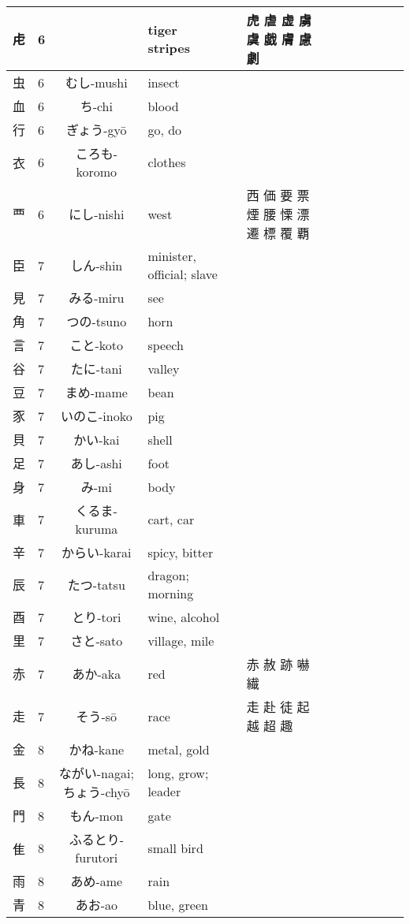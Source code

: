 \documentclass{article}
\begin{document}
{\begin{longtable}{|Cp{1.2cm}|Cp{0.3cm}|Cp{3cm}|Cp{5cm}|Cp{0.5cm}|Cp{5cm}|}
  虍 & 6 &  & tiger stripes &  & 虎 虐 虚 虜 虞 戯 膚 慮 劇 \\ \hline
  虫 & 6 & むし-mushi & insect &  &  \\ \hline
  血 & 6 & ち-chi & blood &  &  \\ \hline
  行 & 6 & ぎょう-gyō & go, do &  &  \\ \hline
  衣 & 6 & ころも-koromo & clothes &  &  \\ \hline
  覀 & 6 & にし-nishi & west &  & 西 価 要 票 煙 腰 慄 漂 遷 標 覆 覇 \\ \hline
  臣 & 7 & しん-shin & minister, official; slave &  &  \\ \hline
  見 & 7 & みる-miru & see &  &  \\ \hline
  角 & 7 & つの-tsuno & horn &  &  \\ \hline
  言 & 7 & こと-koto & speech &  &  \\ \hline
  谷 & 7 & たに-tani & valley &  &  \\ \hline
  豆 & 7 & まめ-mame & bean &  &  \\ \hline
  豕 & 7 & いのこ-inoko & pig &  &  \\ \hline
  貝 & 7 & かい-kai & shell &  &  \\ \hline
  足 & 7 & あし-ashi & foot &  &  \\ \hline
  身 & 7 & み-mi & body &  &  \\ \hline
  車 & 7 & くるま-kuruma & cart, car &  &  \\ \hline
  辛 & 7 & からい-karai & spicy, bitter &  &  \\ \hline
  辰 & 7 & たつ-tatsu & dragon; morning &  &  \\ \hline
  酉 & 7 & とり-tori & wine, alcohol &  &  \\ \hline
  里 & 7 & さと-sato & village, mile &  &  \\ \hline
  赤 & 7 & あか-aka & red &  & 赤 赦 跡 嚇 繊 \\ \hline
  走 & 7 & そう-sō & race &  & 走 赴 徒 起 越 超 趣 \\ \hline
  金 & 8 & かね-kane & metal, gold &  &  \\ \hline
  長 & 8 & ながい-nagai; ちょう-chyō & long, grow; leader &  &  \\ \hline
  門 & 8 & もん-mon & gate &  &  \\ \hline
  隹 & 8 & ふるとり-furutori & small bird &  &  \\ \hline
  雨 & 8 & あめ-ame & rain &  &  \\ \hline
  青 & 8 & あお-ao & blue, green &  &  \\ \hline

\end{longtable}}
\end{document}
